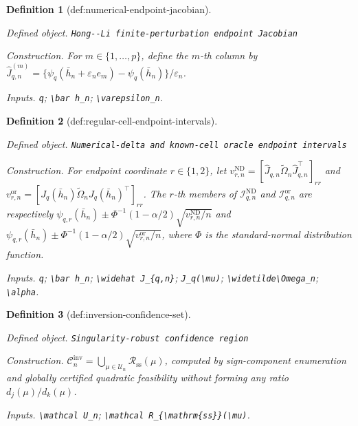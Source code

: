 \documentclass{article}
\newtheorem{definition}{Definition}
\begin{document}
\begin{definition}[def:numerical-endpoint-jacobian]\label{def:numerical-endpoint-jacobian}
\par\smallskip\noindent\emph{Defined object.} \texttt{Hong-\allowbreak{}-\allowbreak{}Li finite-\allowbreak{}perturbation endpoint Jacobian}
\par\smallskip\noindent\emph{Construction.} For \(m\in\{1,\ldots,p\}\), define the \(m\)-th column by \(\widehat J_{q,n}^{(m)}=\{\psi_q(\bar h_n+\varepsilon_n e_m)-\psi_q(\bar h_n)\}/\varepsilon_n\).
\par\smallskip\noindent\emph{Inputs.} \texttt{q}; \texttt{\textbackslash{}\allowbreak{}bar h\_\allowbreak{}n}; \texttt{\textbackslash{}\allowbreak{}varepsilon\_\allowbreak{}n}.
\end{definition}

\begin{definition}[def:regular-cell-endpoint-intervals]\label{def:regular-cell-endpoint-intervals}
\par\smallskip\noindent\emph{Defined object.} \texttt{Numerical-\allowbreak{}delta and known-\allowbreak{}cell oracle endpoint intervals}
\par\smallskip\noindent\emph{Construction.} For endpoint coordinate \(r\in\{1,2\}\), let \(v_{r,n}^{\mathrm{ND}}=[\widehat J_{q,n}\widetilde\Omega_n\widehat J_{q,n}^\top]_{rr}\) and \(v_{r,n}^{\mathrm{or}}=[J_q(\bar h_n)\widetilde\Omega_nJ_q(\bar h_n)^\top]_{rr}\). The \(r\)-th members of \(\mathcal I_{q,n}^{\mathrm{ND}}\) and \(\mathcal I_{q,n}^{\mathrm{or}}\) are respectively \(\psi_{q,r}(\bar h_n)\pm\Phi^{-1}(1-\alpha/2)\sqrt{v_{r,n}^{\mathrm{ND}}/n}\) and \(\psi_{q,r}(\bar h_n)\pm\Phi^{-1}(1-\alpha/2)\sqrt{v_{r,n}^{\mathrm{or}}/n}\), where \(\Phi\) is the standard-normal distribution function.
\par\smallskip\noindent\emph{Inputs.} \texttt{q}; \texttt{\textbackslash{}\allowbreak{}bar h\_\allowbreak{}n}; \texttt{\textbackslash{}\allowbreak{}widehat J\_\allowbreak{}\{q,\allowbreak{}n\}\allowbreak{}}; \texttt{J\_\allowbreak{}q(\textbackslash{}\allowbreak{}mu)}; \texttt{\textbackslash{}\allowbreak{}widetilde\textbackslash{}\allowbreak{}Omega\_\allowbreak{}n}; \texttt{\textbackslash{}\allowbreak{}alpha}.
\end{definition}

\begin{definition}[def:inversion-confidence-set]\label{def:inversion-confidence-set}
\par\smallskip\noindent\emph{Defined object.} \texttt{Singularity-\allowbreak{}robust confidence region}
\par\smallskip\noindent\emph{Construction.} \(\mathcal C_n^{\mathrm{inv}}=\bigcup_{\mu\in\mathcal U_n}\mathcal R_{\mathrm{ss}}(\mu)\), computed by sign-component enumeration and globally certified quadratic feasibility without forming any ratio \(d_j(\mu)/d_k(\mu)\).
\par\smallskip\noindent\emph{Inputs.} \texttt{\textbackslash{}\allowbreak{}mathcal U\_\allowbreak{}n}; \texttt{\textbackslash{}\allowbreak{}mathcal R\_\allowbreak{}\{\textbackslash{}\allowbreak{}mathrm\{ss\}\allowbreak{}\}\allowbreak{}(\textbackslash{}\allowbreak{}mu)}.
\end{definition}
\end{document}
